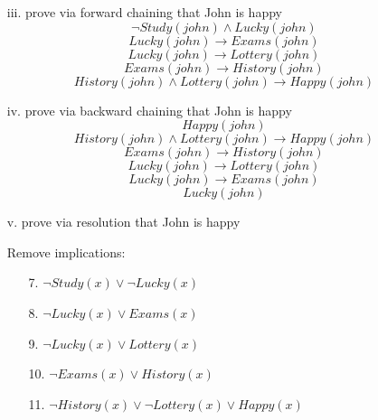 \documentclass[11pt]{article}
\begin{document}
\begin{flushleft}
\begin{enumerate}
\begin{enumerate}
            \item[iii.] prove via forward chaining that John is happy
                $$ \neg Study(john) \wedge Lucky(john) $$
                $$ Lucky(john) \rightarrow Exams(john) $$
                $$ Lucky(john) \rightarrow Lottery(john) $$
                $$ Exams(john) \rightarrow History(john) $$
                $$ History(john) \wedge Lottery(john) \rightarrow Happy(john) $$

            \item[iv.] prove via backward chaining that John is happy
                $$ Happy(john) $$
                $$ History(john) \wedge Lottery(john) \rightarrow Happy(john) $$
                $$ Exams(john) \rightarrow History(john) $$
                $$ Lucky(john) \rightarrow Lottery(john) $$
                $$ Lucky(john) \rightarrow Exams(john) $$
                $$ Lucky(john) $$

            \item[v.] prove via resolution that John is happy\par
                Remove implications:
                \begin{center}
                    \begin{minipage}{0.4\textwidth}
                        \begin{enumerate}
                            \item[7.] $\neg Study(x) \vee \neg Lucky(x)$
                            \item[8.] $\neg Lucky(x) \vee Exams(x)$
                            \item[9.] $\neg Lucky(x) \vee Lottery(x)$
                            \item[10.] $\neg Exams(x) \vee History(x)$
                            \item[11.] $\neg History(x) \vee \neg Lottery(x) \vee
                                Happy(x)$
                        \end{enumerate}
                    \end{minipage}
                \end{center}

        \end{enumerate}

\end{enumerate}

\end{flushleft}
\end{document}

